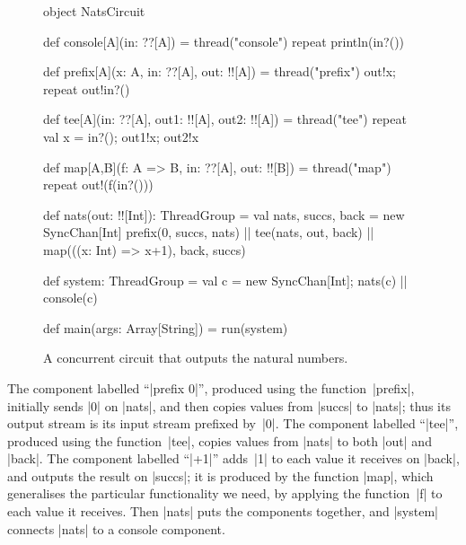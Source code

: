 \begin{center}
\end{center}


\begin{figure}
\begin{scala}
object NatsCircuit{
  def console[A](in: ??[A]) = thread("console"){ repeat{ println(in?()) } }

  def prefix[A](x: A, in: ??[A], out: !![A]) = thread("prefix"){
    out!x; repeat{ out!in?() }
  }

  def tee[A](in: ??[A], out1: !![A], out2: !![A]) = thread("tee"){
    repeat{ val x = in?(); out1!x; out2!x }
  }

  def map[A,B](f: A => B, in: ??[A], out: !![B]) = thread("map"){
    repeat{ out!(f(in?())) }
  }

  def nats(out: !![Int]): ThreadGroup = {
    val nats, succs, back = new SyncChan[Int]
    prefix(0, succs, nats) || tee(nats, out, back) ||
      map(((x: Int) => x+1), back, succs)
  }

  def system: ThreadGroup = {
    val c = new SyncChan[Int]; nats(c) || console(c)
  }

  def main(args: Array[String]) = run(system)
}
\end{scala}
\caption{A concurrent circuit that outputs the natural numbers.}
\label{fig:NatsCircuit}
\end{figure}

The component labelled ``|prefix 0|'', produced using the function~|prefix|,
initially sends |0| on |nats|, and then copies values from |succs| to |nats|;
thus its output stream is its input stream prefixed by~|0|.  The component
labelled ``|tee|'', produced using the function~|tee|, copies values from
|nats| to both |out| and |back|.  The component labelled ``|+1|'' adds~|1| to
each value it receives on |back|, and outputs the result on |succs|; it is
produced by the function |map|, which generalises the particular functionality
we need, by applying the function~|f| to each value it receives.  Then |nats|
puts the components together, and |system| connects |nats| to a console
component.

